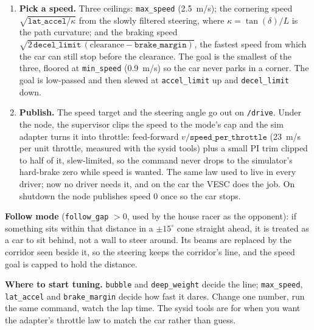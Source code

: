 \begin{enumerate}[leftmargin=*]
  would spoil, but close to it. It is low-passed, except that a genuinely close obstacle
  (under \texttt{brake\_margin} $+0.3$~m) passes straight through so braking is immediate.
  \item \textbf{Pick a speed.} Three ceilings: \texttt{max\_speed} (2.5~m/s); the cornering
  speed $\sqrt{\texttt{lat\_accel}/\kappa}$ from the slowly filtered steering, where
  $\kappa=\tan(\delta)/L$ is the path curvature; and the braking speed
  $\sqrt{2\,\texttt{decel\_limit}\,(\mathrm{clearance}-\texttt{brake\_margin})}$, the fastest speed
  from which the car can still stop before the clearance. The goal is the smallest of the
  three, floored at \texttt{min\_speed} (0.9~m/s) so the car never parks in a corner. The goal
  is low-passed and then slewed at \texttt{accel\_limit} up and \texttt{decel\_limit} down.
  \item \textbf{Publish.} The speed target and the steering angle go out on \texttt{/drive}.
  Under the node, the supervisor clips the speed to the mode's cap and the sim adapter turns it
  into throttle: feed-forward $v/\texttt{speed\_per\_throttle}$ (23~m/s per unit throttle,
  measured with the sysid tools) plus a small PI trim clipped to half of it, slew-limited, so the
  command never drops to the simulator's hard-brake zero while speed is wanted. The same law
  used to live in every driver; now no driver needs it, and on the car the VESC does the job.
  On shutdown the node publishes speed $0$ once so the car stops.
\end{enumerate}

\textbf{Follow mode} (\texttt{follow\_gap} $> 0$, used by the house racer as the opponent):
if something sits within that distance in a $\pm 15^\circ$ cone straight ahead, it is treated
as a car to sit behind, not a wall to steer around. Its beams are replaced by the corridor seen
beside it, so the steering keeps the corridor's line, and the speed goal is capped to hold the
distance.

\textbf{Where to start tuning.} \texttt{bubble} and \texttt{deep\_weight} decide the line;
\texttt{max\_speed}, \texttt{lat\_accel} and \texttt{brake\_margin} decide how fast it dares.
Change one number, run the same command, watch the lap time. The sysid tools are for when
you want the adapter's throttle law to match the car rather than guess.
